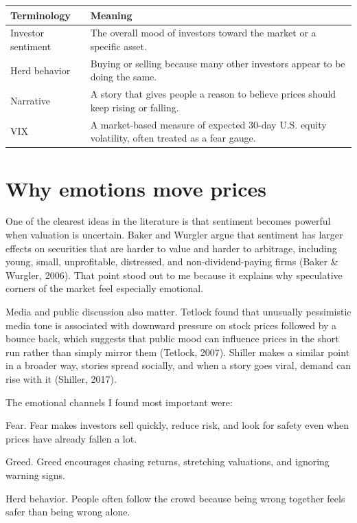 \documentclass[12pt]{article}
\begin{document}
\begin{tabularx}{\textwidth}{|>{\raggedright\arraybackslash}p{}|X|}
\hline
\textbf{Terminology} & \textbf{Meaning} \\
\hline
Investor sentiment & The overall mood of investors toward the market or a specific asset. \\
\hline
Herd behavior & Buying or selling because many other investors appear to be doing the same. \\
\hline
Narrative & A story that gives people a reason to believe prices should keep rising or falling. \\
\hline
VIX & A market-based measure of expected 30-day U.S. equity volatility, often treated as a fear gauge. \\
\hline
\end{tabularx}

\section{Why emotions move prices}

One of the clearest ideas in the literature is that sentiment becomes powerful when valuation is uncertain. Baker and Wurgler argue that sentiment has larger effects on securities that are harder to value and harder to arbitrage, including young, small, unprofitable, distressed, and non-dividend-paying firms (Baker \& Wurgler, 2006). That point stood out to me because it explains why speculative corners of the market feel especially emotional.

Media and public discussion also matter. Tetlock found that unusually pessimistic media tone is associated with downward pressure on stock prices followed by a bounce back, which suggests that public mood can influence prices in the short run rather than simply mirror them (Tetlock, 2007). Shiller makes a similar point in a broader way, stories spread socially, and when a story goes viral, demand can rise with it (Shiller, 2017).

The emotional channels I found most important were:

Fear. Fear makes investors sell quickly, reduce risk, and look for safety even when prices have already fallen a lot.

Greed. Greed encourages chasing returns, stretching valuations, and ignoring warning signs.

Herd behavior. People often follow the crowd because being wrong together feels safer than being wrong alone.
\end{document}
